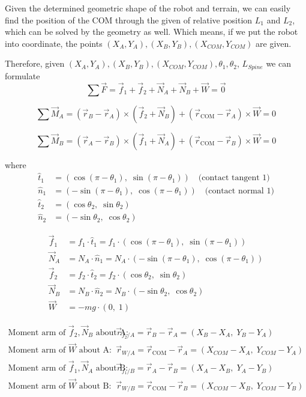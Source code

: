 \documentclass[11pt]{article}
\begin{document}
Given the determined geometric shape of the robot and terrain, we can easily find the position of the COM through
the given of relative position \(L_1\) and \(L_2\), which can be solved by the geometry as well. Which means, if we put
the robot into coordinate, the points \((X_A, Y_A), (X_B, Y_B), (X_{COM}, Y_{COM})\) are given.


Therefore, given \((X_A, Y_A), (X_B, Y_B), (X_{COM}, Y_{COM}), \theta_1, \theta_2\), \(L_{Spine}\) we can formulate
\[
\sum \vec{F} = \vec{f}_1 + \vec{f}_2 + \vec{N}_A + \vec{N}_B + \vec{W} = \vec{0}
\]

\[
\sum \vec{M}_A = 
(\vec{r}_B - \vec{r}_A) \times (\vec{f}_2 + \vec{N}_B)
+ (\vec{r}_{\text{COM}} - \vec{r}_A) \times \vec{W}
= 0
\]

\[
\sum \vec{M}_B = 
(\vec{r}_A - \vec{r}_B) \times (\vec{f}_1 + \vec{N}_A)
+ (\vec{r}_{\text{COM}} - \vec{r}_B) \times \vec{W}
= 0
\]

where
\begin{align*}
\hat{t}_1 &= (\cos(\pi-\theta_1),\; \sin(\pi-\theta_1)) \quad \text{(contact tangent 1)} \\
\hat{n}_1 &= (-\sin(\pi-\theta_1),\; \cos(\pi-\theta_1)) \quad \text{(contact normal 1)} \\
\hat{t}_2 &= (\cos\theta_2,\; \sin\theta_2) \\
\hat{n}_2 &= (-\sin\theta_2,\; \cos\theta_2)
\end{align*}

\begin{align*}
\vec{f}_1 &= f_1 \cdot \hat{t}_1 = f_1 \cdot (\cos(\pi-\theta_1),\; \sin(\pi-\theta_1)) \\
\vec{N}_A &= N_A \cdot \hat{n}_1 = N_A \cdot (-\sin(\pi-\theta_1),\; \cos(\pi-\theta_1)) \\
\vec{f}_2 &= f_2 \cdot \hat{t}_2 = f_2 \cdot (\cos\theta_2,\; \sin\theta_2) \\
\vec{N}_B &= N_B \cdot \hat{n}_2 = N_B \cdot (-\sin\theta_2,\; \cos\theta_2) \\
\vec{W}   &= -mg \cdot (0,\; 1)
\end{align*}


\begin{align*}
\text{Moment arm of } \vec{f}_2, \vec{N}_B \text{ about A}: \quad
& \vec{r}_{f_2/A} = \vec{r}_B - \vec{r}_A = (X_B - X_A,\; Y_B - Y_A) \\
\text{Moment arm of } \vec{W} \text{ about A}: \quad
& \vec{r}_{W/A} = \vec{r}_{\text{COM}} - \vec{r}_A = (X_{COM} - X_A,\; Y_{COM} - Y_A) \\[1ex]
\text{Moment arm of } \vec{f}_1, \vec{N}_A \text{ about B}: \quad
& \vec{r}_{f_1/B} = \vec{r}_A - \vec{r}_B = (X_A - X_B,\; Y_A - Y_B) \\
\text{Moment arm of } \vec{W} \text{ about B}: \quad
& \vec{r}_{W/B} = \vec{r}_{\text{COM}} - \vec{r}_B = (X_{COM} - X_B,\; Y_{COM} - Y_B)
\end{align*}
\end{document}
